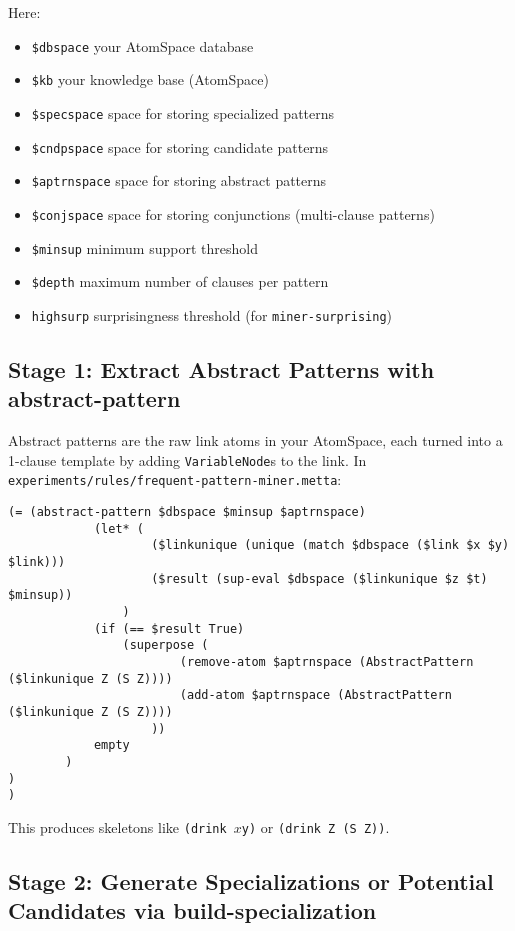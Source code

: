\documentclass{article}
\begin{document}
Here:\\

\begin{itemize}
  \item \texttt{\$dbspace} your AtomSpace database
  \item \texttt{\$kb} your knowledge base (AtomSpace)
  \item \texttt{\$specspace} space for storing specialized patterns
  \item \texttt{\$cndpspace} space for storing candidate patterns
  \item \texttt{\$aptrnspace} space for storing abstract patterns
  \item \texttt{\$conjspace} space for storing conjunctions (multi-clause patterns)
  \item \texttt{\$minsup} minimum support threshold
  \item \texttt{\$depth} maximum number of clauses per pattern
  \item \texttt{highsurp} surprisingness threshold (for \texttt{miner-surprising})
\end{itemize}

\subsection{Stage 1: Extract Abstract Patterns with abstract-pattern}

Abstract patterns are the raw link atoms in your AtomSpace, each turned into a 1-clause template by adding \texttt{VariableNode}s to the link.  In \texttt{experiments/rules/frequent-pattern-miner.metta}:

\begin{verbatim}
(= (abstract-pattern $dbspace $minsup $aptrnspace)
            (let* (
                    ($linkunique (unique (match $dbspace ($link $x $y) $link)))
                    ($result (sup-eval $dbspace ($linkunique $z $t) $minsup))
                )
            (if (== $result True)
                (superpose (
                        (remove-atom $aptrnspace (AbstractPattern ($linkunique Z (S Z))))
                        (add-atom $aptrnspace (AbstractPattern ($linkunique Z (S Z))))
                    ))
            empty
        )
)
)
\end{verbatim}

This produces skeletons like \texttt{(drink $x $y)} or \texttt{(drink Z (S Z))}.

\subsection{Stage 2: Generate Specializations or Potential Candidates via build-specialization}
\end{document}
